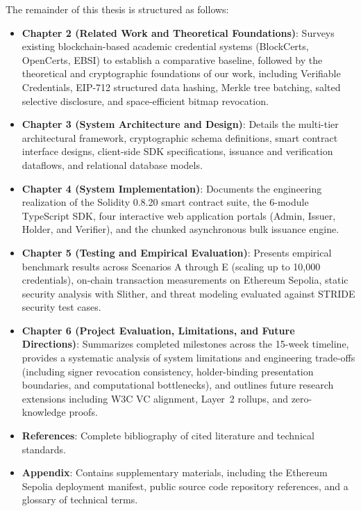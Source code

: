 The remainder of this thesis is structured as follows:
\begin{itemize}
    \item \textbf{Chapter 2 (Related Work and Theoretical Foundations)}: Surveys existing blockchain-based academic credential systems (BlockCerts, OpenCerts, EBSI) to establish a comparative baseline, followed by the theoretical and cryptographic foundations of our work, including Verifiable Credentials, EIP-712 structured data hashing, Merkle tree batching, salted selective disclosure, and space-efficient bitmap revocation.
    \item \textbf{Chapter 3 (System Architecture and Design)}: Details the multi-tier architectural framework, cryptographic schema definitions, smart contract interface designs, client-side SDK specifications, issuance and verification dataflows, and relational database models.
    \item \textbf{Chapter 4 (System Implementation)}: Documents the engineering realization of the Solidity 0.8.20 smart contract suite, the 6-module TypeScript SDK, four interactive web application portals (Admin, Issuer, Holder, and Verifier), and the chunked asynchronous bulk issuance engine.
    \item \textbf{Chapter 5 (Testing and Empirical Evaluation)}: Presents empirical benchmark results across Scenarios A through E (scaling up to 10,000 credentials), on-chain transaction measurements on Ethereum Sepolia, static security analysis with Slither, and threat modeling evaluated against STRIDE security test cases.
    \item \textbf{Chapter 6 (Project Evaluation, Limitations, and Future Directions)}: Summarizes completed milestones across the 15-week timeline, provides a systematic analysis of system limitations and engineering trade-offs (including signer revocation consistency, holder-binding presentation boundaries, and computational bottlenecks), and outlines future research extensions including W3C VC alignment, Layer~2 rollups, and zero-knowledge proofs.
    \item \textbf{References}: Complete bibliography of cited literature and technical standards.
    \item \textbf{Appendix}: Contains supplementary materials, including the Ethereum Sepolia deployment manifest, public source code repository references, and a glossary of technical terms.
\end{itemize}

